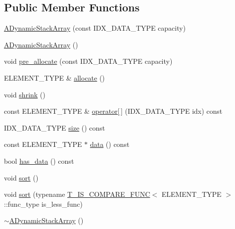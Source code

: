 \subsection*{Public Member Functions}
\begin{DoxyCompactItemize}
\item 
\hyperlink{classuva_1_1smt_1_1tries_1_1alloc_1_1_a_dynamic_stack_array_a200d0cad1e0d31fd1839e44afea95cc6}{A\+Dynamic\+Stack\+Array} (const I\+D\+X\+\_\+\+D\+A\+T\+A\+\_\+\+T\+Y\+P\+E capacity)
\item 
\hyperlink{classuva_1_1smt_1_1tries_1_1alloc_1_1_a_dynamic_stack_array_aa5359a42aa30133ea415c8c766131c1e}{A\+Dynamic\+Stack\+Array} ()
\item 
void \hyperlink{classuva_1_1smt_1_1tries_1_1alloc_1_1_a_dynamic_stack_array_ae4b5f422153bc55db99acb2a3dfac4dc}{pre\+\_\+allocate} (const I\+D\+X\+\_\+\+D\+A\+T\+A\+\_\+\+T\+Y\+P\+E capacity)
\item 
E\+L\+E\+M\+E\+N\+T\+\_\+\+T\+Y\+P\+E \& \hyperlink{classuva_1_1smt_1_1tries_1_1alloc_1_1_a_dynamic_stack_array_aa63ae54d25f93bb74e27a54d47611144}{allocate} ()
\item 
void \hyperlink{classuva_1_1smt_1_1tries_1_1alloc_1_1_a_dynamic_stack_array_ae38ab2817eaaef153f72702372b7292f}{shrink} ()
\item 
const E\+L\+E\+M\+E\+N\+T\+\_\+\+T\+Y\+P\+E \& \hyperlink{classuva_1_1smt_1_1tries_1_1alloc_1_1_a_dynamic_stack_array_a7d0f6f8bf59feecc284d9234b452a2e1}{operator\mbox{[}$\,$\mbox{]}} (I\+D\+X\+\_\+\+D\+A\+T\+A\+\_\+\+T\+Y\+P\+E idx) const 
\item 
I\+D\+X\+\_\+\+D\+A\+T\+A\+\_\+\+T\+Y\+P\+E \hyperlink{classuva_1_1smt_1_1tries_1_1alloc_1_1_a_dynamic_stack_array_a546dee94b0049cd565a73c4ccc3eba3b}{size} () const 
\item 
const E\+L\+E\+M\+E\+N\+T\+\_\+\+T\+Y\+P\+E $\ast$ \hyperlink{classuva_1_1smt_1_1tries_1_1alloc_1_1_a_dynamic_stack_array_a82a10dc90d917401f69700bce73ea497}{data} () const 
\item 
bool \hyperlink{classuva_1_1smt_1_1tries_1_1alloc_1_1_a_dynamic_stack_array_a73d36d639512c2f249871cc20e724f9f}{has\+\_\+data} () const 
\item 
void \hyperlink{classuva_1_1smt_1_1tries_1_1alloc_1_1_a_dynamic_stack_array_a660df44c4d77f763e677bd90a13fbd7f}{sort} ()
\item 
void \hyperlink{classuva_1_1smt_1_1tries_1_1alloc_1_1_a_dynamic_stack_array_a0d7e840a9dd97394e2e2cb1ad9c375ff}{sort} (typename \hyperlink{structuva_1_1smt_1_1utils_1_1array_1_1_t___i_s___c_o_m_p_a_r_e___f_u_n_c}{T\+\_\+\+I\+S\+\_\+\+C\+O\+M\+P\+A\+R\+E\+\_\+\+F\+U\+N\+C}$<$ E\+L\+E\+M\+E\+N\+T\+\_\+\+T\+Y\+P\+E $>$\+::func\+\_\+type is\+\_\+less\+\_\+func)
\item 
\hyperlink{classuva_1_1smt_1_1tries_1_1alloc_1_1_a_dynamic_stack_array_ac0f075f258c5d2995ee4efbcd1a44316}{$\sim$\+A\+Dynamic\+Stack\+Array} ()
\end{DoxyCompactItemize}
